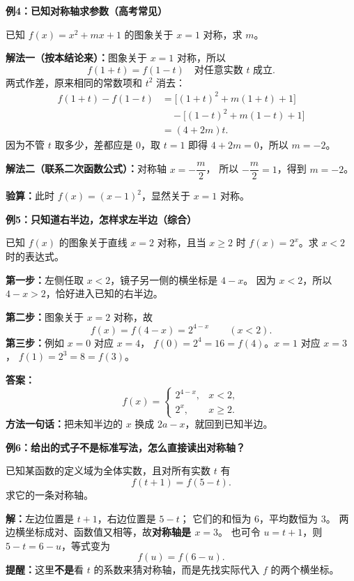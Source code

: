 \begin{examplebox}
\textbf{\textcolor{CExample}{例4：已知对称轴求参数（高考常见）}}


  已知 $f(x)=x^2+mx+1$ 的图象关于 $x=1$ 对称，求 $m$。

  \textbf{解法一（按本结论来）：}图象关于 $x=1$ 对称，所以
  \[
    f(1+t)=f(1-t)\quad\text{对任意实数 }t\text{ 成立}.
  \]
  两式作差，原来相同的常数项和 $t^2$ 消去：
  \[
    \begin{aligned}
    f(1+t)-f(1-t)
      &=\bigl[(1+t)^2+m(1+t)+1\bigr]\\
      &\quad-\bigl[(1-t)^2+m(1-t)+1\bigr]\\
      &=(4+2m)t.
    \end{aligned}
  \]
  因为不管 $t$ 取多少，差都应是 $0$，取 $t=1$ 即得
  $4+2m=0$，所以 $\boxed{m=-2}$。

  \textbf{解法二（联系二次函数公式）：}对称轴 $x=-\dfrac{m}{2}$，
  所以 $-\dfrac m2=1$，得到 $m=-2$。

  \textbf{验算：}此时 $f(x)=(x-1)^2$，显然关于 $x=1$ 对称。

  \medskip
  
\end{examplebox}
\clearpage
\begin{examplebox}
\textbf{\textcolor{CExample}{例5：只知道右半边，怎样求左半边（综合）}}


  已知 $f(x)$ 的图象关于直线 $x=2$ 对称，且当 $x\ge2$ 时
  $f(x)=2^x$。求 $x<2$ 时的表达式。

  \textbf{第一步：}左侧任取 $x<2$，镜子另一侧的横坐标是 $4-x$。
  因为 $x<2$，所以 $4-x>2$，恰好进入已知的右半边。

  \textbf{第二步：}图象关于 $x=2$ 对称，故
  \[
    f(x)=f(4-x)=2^{4-x}\qquad(x<2).
  \]
  \textbf{第三步：}例如 $x=0$ 对应 $x=4$，
  $f(0)=2^4=16=f(4)$。$x=1$ 对应 $x=3$，
  $f(1)=2^3=8=f(3)$。

  \textbf{答案：}
  \[
     \boxed{f(x)=\begin{cases}2^{4-x},&x<2,\\2^x,&x\ge 2.\end{cases}}
  \]
  \textbf{方法一句话：}把未知半边的 $x$ 换成 $2a-x$，就回到已知半边。

  \medskip
  
\end{examplebox}
\clearpage
\begin{examplebox}
\textbf{\textcolor{CExample}{例6：给出的式子不是标准写法，怎么直接读出对称轴？}}


  已知某函数的定义域为全体实数，且对所有实数 $t$ 有
  \[
      f(t+1)=f(5-t).
  \]
  求它的一条对称轴。

  \textbf{解：}左边位置是 $t+1$，右边位置是 $5-t$；
  它们的和恒为 $6$，平均数恒为 $3$。
  两边横坐标成对、函数值又相等，故\textbf{对称轴是 $x=3$}。
  也可令 $u=t+1$，则 $5-t=6-u$，等式变为
  \[
      f(u)=f(6-u).
  \]
  \textbf{提醒：}这里\textbf{不是}看 $t$ 的系数来猜对称轴，而是先找实际代入 $f$ 的两个横坐标。

  \medskip
  
\end{examplebox}
